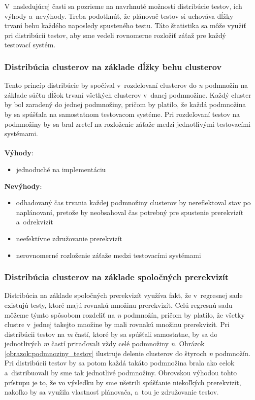 V~nasledujúcej časti sa pozrieme na navrhnuté možnosti distribúcie 
testov, ich výhody a~nevýhody. Treba podotknúť, že plánovač testov si 
uchováva dĺžky trvaní behu každého naposledy spusteného testu.
Táto štatistika sa môže využiť pri distribúcii testov, aby sme vedeli 
rovnomerne rozložiť záťaž pre každý testovací systém.

\subsubsection*{Distribúcia clusterov na základe dĺžky behu clusterov}
Tento princíp distribúcie by spočíval v~rozdeľovaní clusterov do \textit{n} 
podmnožín na základe súčtu dĺžok trvaní všetkých clusterov v~danej podmnožine. 
Každý cluster by bol zaradený do jednej podmnožiny, pričom by platilo,
že každá podmnožina by sa spúšťala na samostatnom testovacom systéme. 
Pri rozdeľovaní testov na podmnožiny by sa bral zreteľ na rozloženie 
záťaže medzi jednotlivými testovacími systémami.
\\
\\
\noindent \textbf{Výhody}:
\begin{itemize}
\item jednoduché na implementáciu
\end{itemize} 

\noindent \textbf{Nevýhody}:
\begin{itemize}
\item odhadovaný čas trvania každej podmnožiny clusterov by nereflektoval stav 
po naplánovaní, pretože by neobsahoval čas potrebný pre spustenie 
prerekvizít a~odrekvizít
\item neefektívne združovanie prerekvizít
\item nerovnomerné rozloženie záťaže medzi testovacími systémami
\end{itemize}

\subsubsection*{Distribúcia clusterov na základe spoločných prerekvizít}
Distribúcia na základe spoločných prerekvizít využíva fakt, že 
v~regresnej sade existujú testy, ktoré majú rovnakú množinu prerekvizít.
Celú regresnú sadu môžeme týmto spôsobom rozdeliť na \emph{n} podmnožín, 
pričom by platilo, že všetky clustre v~jednej takejto množine by mali
rovnakú množinu prerekvizít. Pri distribúcii testov na \emph{m} častí, 
ktoré by sa spúšťali samostatne, by sa do jednotlivých \emph{m} častí
priraďovali vždy celé podmnožiny \emph{n}. 
Obrázok \ref{obrazok:podmnoziny_testov} ilustruje delenie clusterov do 
štyroch \emph{n} podmnožín. Pri distribúcii testov by sa potom každá 
takáto podmnožina brala ako celok a~distribuovali by sme tak 
jednotlivé podmnožiny.
Obrovskou výhodou tohto prístupu je to, že vo výsledku by sme ušetrili 
spúšťanie niekoľkých prerekvizít, nakoľko by sa využila vlastnosť 
plánovača, a~tou je združovanie testov. 

